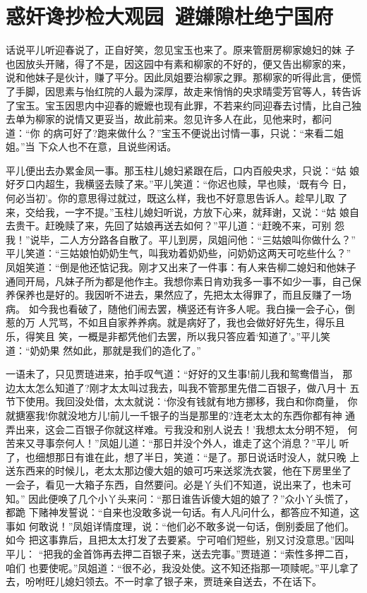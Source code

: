 \chapter{惑奸谗抄检大观园~避嫌隙杜绝宁国府}

话说平儿听迎春说了，正自好笑，忽见宝玉也来了。原来管厨房柳家媳妇的妹
子也因放头开赌，得了不是，因这园中有素和柳家的不好的，便又告出柳家的来，
说和他妹子是伙计，赚了平分。因此凤姐要治柳家之罪。那柳家的听得此言，便慌
了手脚，因思素与怡红院的人最为深厚，故走来悄悄的央求晴雯芳官等人，转告诉
了宝玉。宝玉因思内中迎春的嬷嬷也现有此罪，不若来约同迎春去讨情，比自己独
去单为柳家的说情又更妥当，故此前来。忽见许多人在此，见他来时，都问道：“你
的病可好了?跑来做什么？”宝玉不便说出讨情一事，只说：“来看二姐姐。”当
下众人也不在意，且说些闲话。

平儿便出去办累金凤一事。那玉柱儿媳妇紧跟在后，口内百般央求，只说：“姑
娘好歹口内超生，我横竖去赎了来。”平儿笑道：“你迟也赎，早也赎，‘既有今
日，何必当初’。你的意思得过就过，既这么样，我也不好意思告诉人。趁早儿取
了来，交给我，一字不提。”玉柱儿媳妇听说，方放下心来，就拜谢，又说：“姑
娘自去贵干。赶晚赎了来，先回了姑娘再送去如何？”平儿道：“赶晚不来，可别
怨我！”说毕，二人方分路各自散了。平儿到房，凤姐问他：“三姑娘叫你做什么？”
平儿笑道：“三姑娘怕奶奶生气，叫我劝着奶奶些，问奶奶这两天可吃些什么？”
凤姐笑道：“倒是他还惦记我。刚才又出来了一件事：有人来告柳二媳妇和他妹子
通同开局，凡妹子所为都是他作主。我想你素日肯劝我多一事不如少一事，自己保
养保养也是好的。我因听不进去，果然应了，先把太太得罪了，而且反赚了一场病。
如今我也看破了，随他们闹去罢，横竖还有许多人呢。我白操一会子心，倒惹的万
人咒骂，不如且自家养养病。就是病好了，我也会做好好先生，得乐且乐，得笑且
笑，一概是非都凭他们去罢，所以我只答应着‘知道了’。”平儿笑道：“奶奶果
然如此，那就是我们的造化了。”

一语未了，只见贾琏进来，拍手叹气道：“好好的又生事!前儿我和鸳鸯借当，
那边太太怎么知道了?刚才太太叫过我去，叫我不管那里先借二百银子，做八月十
五节下使用。我回没处借，太太就说：‘你没有钱就有地方挪移，我白和你商量，
你就搪塞我!你就没地方儿!前儿一千银子的当是那里的?连老太太的东西你都有神
通弄出来，这会二百银子你就这样难。亏我没和别人说去！’我想太太分明不短，
何苦来又寻事奈何人！”凤姐儿道：“那日并没个外人，谁走了这个消息？”平儿
听了，也细想那日有谁在此，想了半日，笑道：“是了。那日说话时没人，就只晚
上送东西来的时候儿，老太太那边傻大姐的娘可巧来送浆洗衣裳，他在下房里坐了
一会子，看见一大箱子东西，自然要问。必是丫头们不知道，说出来了，也未可知。”
因此便唤了几个小丫头来问：“那日谁告诉傻大姐的娘了？”众小丫头慌了，都跪
下赌神发誓说：“自来也没敢多说一句话。有人凡问什么，都答应不知道，这事如
何敢说！”凤姐详情度理，说：“他们必不敢多说一句话，倒别委屈了他们。如今
把这事靠后，且把太太打发了去要紧。宁可咱们短些，别又讨没意思。”因叫平儿：
“把我的金首饰再去押二百银子来，送去完事。”贾琏道：“索性多押二百，咱们
也要使呢。”凤姐道：“很不必，我没处使。这不知还指那一项赎呢。”平儿拿了
去，吩咐旺儿媳妇领去。不一时拿了银子来，贾琏亲自送去，不在话下。

